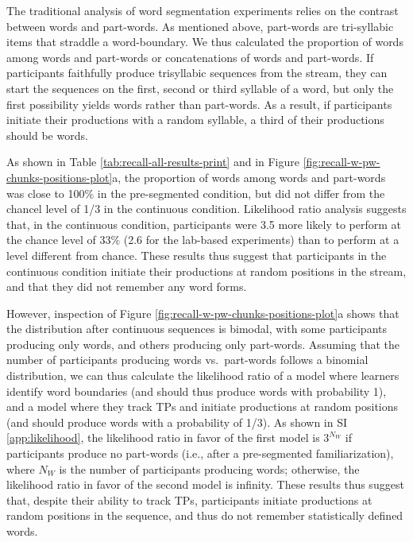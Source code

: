 \documentclass[]{article}
\begin{document}
The traditional analysis of word segmentation experiments relies on the contrast between words and part-words. As mentioned above, part-words are tri-syllabic items that straddle a word-boundary. We thus calculated the proportion of words among words and part-words or concatenations of words and part-words. If participants faithfully produce trisyllabic sequences from the stream, they can start the sequences on the first, second or third syllable of a word, but only the first possibility yields words rather than part-words. As a result, if participants initiate their productions with a random syllable, a third of their productions should be words.

As shown in Table \ref{tab:recall-all-results-print} and in Figure \ref{fig:recall-w-pw-chunks-positions-plot}a, the proportion of words among words and part-words was close to 100\% in the pre-segmented condition, but did not differ from the chancel level of 1/3 in the continuous condition. Likelihood ratio analysis suggests that, in the continuous condition, participants were 3.5 more likely to perform at the chance level of 33\% (2.6 for the lab-based experiments) than to perform at a level different from chance. These results thus suggest that participants in the continuous condition initiate their productions at random positions in the stream, and that they did not remember any word forms.

However, inspection of Figure \ref{fig:recall-w-pw-chunks-positions-plot}a shows that the distribution after continuous sequences is bimodal, with some participants producing only words, and others producing only part-words. Assuming that the number of participants producing words vs.~part-words follows a binomial distribution, we can thus calculate the likelihood ratio of a model where learners identify word boundaries (and should thus produce words with probability 1), and a model where they track TPs and initiate productions at random positions (and should produce words with a probability of 1/3). As shown in SI \ref{app:likelihood}, the likelihood ratio in favor of the first model is \(3^{N_W}\) if participants produce no part-words (i.e., after a pre-segmented familiarization), where \(N_W\) is the number of participants producing words; otherwise, the likelihood ratio in favor of the second model is infinity. These results thus suggest that, despite their ability to track TPs, participants initiate productions at random positions in the sequence, and thus do not remember statistically defined words.
\end{document}
